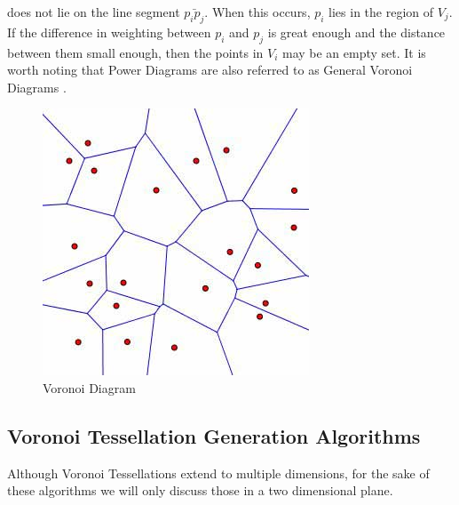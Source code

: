 %
does not lie on the line segment $\bar{p_ip_j}$. When this occurs, $p_i$ lies in the region of $V_j$. If the difference in weighting between $p_i$ and $p_j$ is great enough and the distance between them small enough, then the points in $V_i$ may be an empty set. It is worth noting that Power Diagrams are also referred to as General Voronoi Diagrams \citep{aurenhammer1987power}.
%
%
\begin{figure}[H]
    \centering
    \includegraphics[scale=0.65]{Images/voronoi.jpg}
    \caption[]{Voronoi Diagram\footnotemark}
    \label{tes:fig:voreg}
\end{figure}
\subsection{Voronoi Tessellation Generation Algorithms}\label{tes:sec:tga}
Although Voronoi Tessellations extend to multiple dimensions, for the sake of these algorithms we will only discuss those in a two dimensional plane.
%
